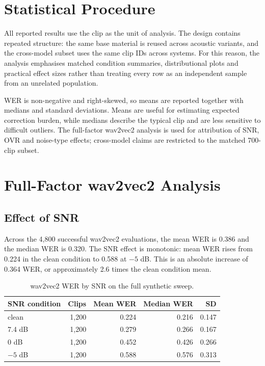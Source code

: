 \section{Statistical Procedure}
All reported results use the clip as the unit of analysis. The design contains repeated
structure: the same base material is reused across acoustic variants, and the cross-model subset
uses the same clip IDs across systems. For this reason, the analysis emphasises matched
condition summaries, distributional plots and practical effect sizes rather than treating every
row as an independent sample from an unrelated population.

WER is non-negative and right-skewed, so means are reported together with medians and standard
deviations. Means are useful for estimating expected correction burden, while medians describe
the typical clip and are less sensitive to difficult outliers. The full-factor wav2vec2 analysis
is used for attribution of SNR, OVR and noise-type effects; cross-model claims are restricted to
the matched 700-clip subset.

\section{Full-Factor wav2vec2 Analysis}
\subsection{Effect of SNR}
Across the 4,800 successful wav2vec2 evaluations, the mean WER is 0.386 and the median WER is
0.320. The SNR effect is monotonic: mean WER rises from 0.224 in the clean condition to 0.588
at \(-5\) dB. This is an absolute increase of 0.364 WER, or approximately 2.6 times the clean
condition mean.

\begin{table}[htbp]
\centering
\caption{wav2vec2 WER by SNR on the full synthetic sweep.}
\label{tab:wav2vec2_snr_summary}
\begin{tabular}{lrrrr}
\toprule
\textbf{SNR condition} & \textbf{Clips} & \textbf{Mean WER} & \textbf{Median WER} & \textbf{SD} \\
\midrule
clean & 1,200 & 0.224 & 0.216 & 0.147 \\
7.4 dB & 1,200 & 0.279 & 0.266 & 0.167 \\
0 dB & 1,200 & 0.452 & 0.426 & 0.266 \\
\(-5\) dB & 1,200 & 0.588 & 0.576 & 0.313 \\
\bottomrule
\end{tabular}
\end{table}

